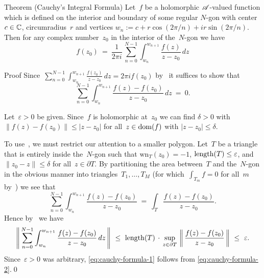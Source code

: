 \documentclass[a]{subfiles}
\begin{document}
\begin{parsec}%
\begin{point}{Theorem (Cauchy's Integral Formula)}%
Let~$f$ be a holomorphic $\mathscr{A}$-valued function
which is defined on the interior and boundary
of some regular $N$-gon 
with center~$c\in\mathbb{C}$,
circumradius~$r$
and vertices $w_n := c+r\cos(2\pi/n)+ir\sin(2\pi/n)$.
Then for any complex number~$z_0$ in
the interior of the~$N$-gon
we have
\begin{equation*}
	f(z_0)\ = \ \frac{1}{2\pi i}\,\sum_{n=0}^{N-1}\int_{w_n}^{w_{n+1}}
	\frac{f(z)}{z-z_0}\,dz
\end{equation*}
\begin{point}{Proof}%
	Since~$\sum_{n=0}^{N-1} \int_{w_n}^{w_{n+1}} \frac{f(z_0)}{z-z_0}\,dz
	= 2\pi i f(z_0)$ by~
it suffices to show that
\begin{equation}
\label{eq:cauchy-formula-1}
\sum_{n=0}^{N-1}\int_{w_n}^{w_{n+1}} \frac{f(z)-f(z_0)}{z-z_0}\,dz \ = \ 0.
\end{equation}
\begin{point}%
Let~$\varepsilon>0$ be given.
Since~$f$ is holomorphic at~$z_0$
we can find $\delta>0$ with
$\|f(z)-f(z_0)\|\leq \left|z-z_0\right|$
for all~$z\in\operatorname{dom}(f)$ with $\left|z-z_0\right|\leq \delta$. 
\end{point}
\begin{point}%
To use~,
we must restrict our attention to a smaller polygon.
Let~$T$ be a triangle 
that is entirely inside the~$N$-gon
such that  $\mathrm{wn}_T(z_0)=-1$,
$\operatorname{length}(T)\leq \varepsilon$,
and $\|z_0-z\|\leq \delta$ for all~$z\in \partial T$.
By partitioning the area
between~$T$ and the~$N$-gon
in the obvious manner
into triangles~$T_1,\dotsc,T_M$
(for which~$\int_{T_m}f=0$ for all~$m$ by~)
we see that
\begin{equation}
\label{eq:cauchy-formula-2}
\sum_{n=0}^{N-1}\int_{w_n}^{w_{n+1}} \frac{f(z)-f(z_0)}{z-z_0}
\ = \ 
\int_T \frac{f(z)-f(z_0)}{z-z_0}.
\end{equation}
Hence by~
we have
\begin{equation*}
	\left\|\,\sum_{n=0}^{N-1} 
	\int_{w_n}^{w_{n+1}} \frac{f(z)-f(z_0)}{z-z_0}\,dz\,\right\|
\ \leq \ \operatorname{length}(T)\,\cdot\,
\sup_{z\in\partial T} \,\left\|\,\frac{f(z)-f(z_0)}{z-z_0}\,\right\|
\ \leq \ \varepsilon.
\end{equation*}
Since~$\varepsilon>0$ was arbitrary,
 \eqref{eq:cauchy-formula-1}
follows from \eqref{eq:cauchy-formula-2}.\qed

\end{point}
\end{point}
\end{point}
\end{parsec}
\end{document}
